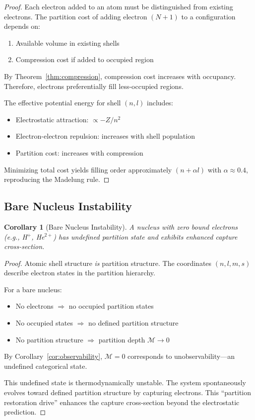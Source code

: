 \documentclass[twocolumn,10pt,a4paper]{article}
\newtheorem{corollary}[theorem]{Corollary}
\theoremstyle{definition}
\theoremstyle{remark}
\newcommand{\Depth}{\mathcal{M}}
\begin{document}
\begin{proof}
Each electron added to an atom must be distinguished from existing electrons. The partition cost of adding electron $(N+1)$ to a configuration depends on:
\begin{enumerate}
    \item Available volume in existing shells
    \item Compression cost if added to occupied region
\end{enumerate}

By Theorem~\ref{thm:compression}, compression cost increases with occupancy. Therefore, electrons preferentially fill less-occupied regions.

The effective potential energy for shell $(n, l)$ includes:
\begin{itemize}
    \item Electrostatic attraction: $\propto -Z/n^2$
    \item Electron-electron repulsion: increases with shell population
    \item Partition cost: increases with compression
\end{itemize}

Minimizing total cost yields filling order approximately $(n + \alpha l)$ with $\alpha \approx 0.4$, reproducing the Madelung rule.
\end{proof}

\subsection{Bare Nucleus Instability}

\begin{corollary}[Bare Nucleus Instability]
\label{cor:bare_nucleus}
A nucleus with zero bound electrons (e.g., H$^+$, He$^{2+}$) has undefined partition state and exhibits enhanced capture cross-section.
\end{corollary}

\begin{proof}
Atomic shell structure \emph{is} partition structure. The coordinates $(n, l, m, s)$ describe electron states in the partition hierarchy.

For a bare nucleus:
\begin{itemize}
    \item No electrons $\Rightarrow$ no occupied partition states
    \item No occupied states $\Rightarrow$ no defined partition structure
    \item No partition structure $\Rightarrow$ partition depth $\Depth \to 0$
\end{itemize}

By Corollary~\ref{cor:observability}, $\Depth = 0$ corresponds to unobservability---an undefined categorical state.

This undefined state is thermodynamically unstable. The system spontaneously evolves toward defined partition structure by capturing electrons. This ``partition restoration drive'' enhances the capture cross-section beyond the electrostatic prediction.
\end{proof}
\end{document}
